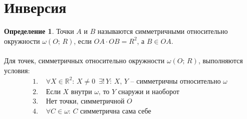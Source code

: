 \documentclass[12pt]{article}
\theoremstyle{definition}
\newtheorem{definition}{Определение}
\newcommand{\R}{\mathbb{R}}
\begin{document}
    \section{Инверсия}
    \begin{definition}
        Точки $A$ и $B$ называются симметричными относительно окружности $\omega(O;\,R)$, если $OA\cdot OB=R^2$, а $B\in OA$.\\\\
        Для точек, симметричных относительно окружности $\omega(O;\,R)$, выполняются условия:
        \begin{align*}
            1.\,\,&\forall X\in \R^2:\,X\neq0\,\,\,\exists!\,Y:\,X,\,Y \text{ -- симметричны относительно } \omega\\
            2.\,\,&\text{Если } X \text{ внутри } \omega\text{, то } Y \text{ снаружи и наоборот}\\
            3.\,\,&\text{Нет точки, симметричной } O\\
            4.\,\,&\forall C \in \omega:\,C \text{ симметрична сама себе}
        \end{align*}
    \end{definition}
\end{document}
